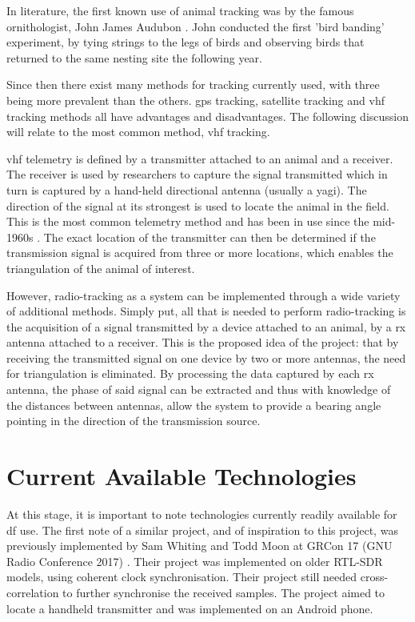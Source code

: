 \documentclass[class=report,11pt,crop=false]{standalone}
\begin{document}
In literature, the first known use of animal tracking was by the famous ornithologist, John James Audubon \cite{james-banding}. John conducted the first 'bird banding' experiment, by tying strings to the legs of birds and observing birds that returned to the same nesting site the following year.  

Since then there exist many methods for tracking currently used, with three being more prevalent than the others. \gls{gps} tracking, satellite tracking and \gls{vhf} tracking methods all have advantages and disadvantages. The following discussion will relate to the most common method, \gls{vhf} tracking. 

\gls{vhf} telemetry is defined by a transmitter attached to an animal and a receiver. The receiver  is used by researchers to capture the signal transmitted which in turn is captured by a hand-held directional antenna (usually a yagi). The direction of the signal at its strongest is used to locate the animal in the field. This is the most common telemetry method and has been in use since the mid-1960s \cite{wild-life-telem}. The exact location of the transmitter can then be determined if the transmission signal is acquired from three or more locations, which enables the triangulation of the animal of interest. 

However, radio-tracking as a system can be implemented through a wide variety of additional methods. Simply put, all that is needed to perform radio-tracking is the acquisition of a signal transmitted by a device attached to an animal, by a \gls{rx} antenna attached to a receiver. This is the proposed idea of the project: that by receiving the transmitted signal on one device by two or more antennas, the need for triangulation is eliminated. By processing the data captured by each \gls{rx} antenna, the phase of said signal can be extracted and thus with knowledge of the distances between antennas, allow the system to provide a bearing angle pointing in the direction of the transmission source.


\section{Current Available Technologies}

At this stage, it is important to note technologies currently readily available for \gls{df} use.
The first note of a similar project, and of inspiration to this project, was previously implemented by Sam Whiting and Todd Moon at GRCon 17 (GNU Radio Conference 2017) \cite{gnu-con17}. Their project was implemented on older RTL-SDR models, using coherent clock synchronisation. Their project still needed cross-correlation to further synchronise the received samples. The project aimed to locate a handheld transmitter and was implemented on an Android phone.
\end{document}
